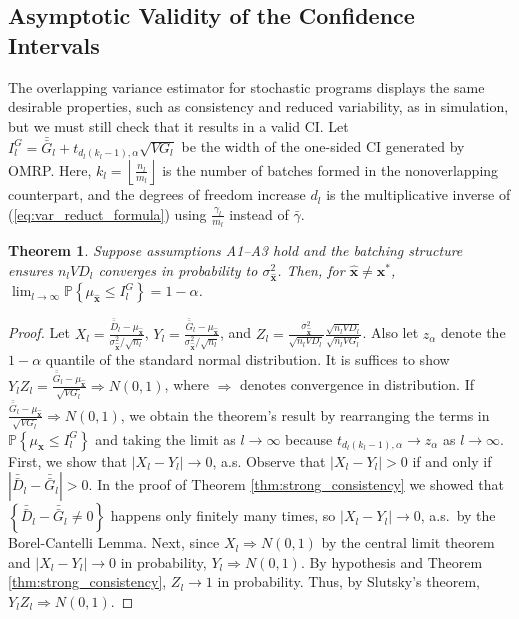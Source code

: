 \documentclass[12pt]{article}
\newtheorem{theorem}{Theorem}
\newcommand{\p}[1]{\mathbb{P} \left\{ #1 \right\}}
\newcommand{\x}{\mathbf{x}}
\newcommand{\xh}{{\hat{\x}}}
\newcommand{\xs}{\x^*}
\newcommand{\gammab}{\bar{\gamma}}
\newcommand{\gb}{\bar{G}}
\newcommand{\gbb}{\bar{\gb}}
\newcommand{\db}{\bar{D}}
\newcommand{\dbb}{\bar{\db}}
\begin{document}
\subsection{Asymptotic Validity of the Confidence Intervals}
\label{ssec:validity}

The overlapping variance estimator for stochastic programs displays the same desirable properties, such as consistency and reduced variability, as in simulation, but we must still check that it results in a valid CI.  
Let $I^G_l = \gbb_l + t_{d_l \left( k_l-1\right),\alpha} \sqrt{VG_l}$ be the width of the one-sided CI generated by OMRP. 
Here, $k_l= \left\lfloor\frac{n_l}{m_l}\right\rfloor $ is the number of batches formed in the nonoverlapping counterpart, and the degrees of freedom increase $d_l$ is the multiplicative inverse of (\ref{eq:var_reduct_formula}) using $\frac{\gamma_l}{m_l}$ instead of $\gammab$.

\begin{theorem} \label{thm:conf_int}
	Suppose assumptions A1--A3 hold and the batching structure ensures $n_l VD_l$ converges in probability to $\sigma^2_\xh$.  
        Then, for $\xh \neq \xs$, $\lim_{l\rightarrow\infty} \p{\mu_\xh \leq I^G_l} = 1 - \alpha$.
\end{theorem}

\begin{proof} 
			Let $X_l = \frac{\dbb_l - \mu_\xh}{\sigma^2_\xh/\sqrt{n_l}}$, $Y_l = \frac{\gbb_l - \mu_\xh}{\sigma^2_\xh/\sqrt{n_l}}$, and $Z_l = \frac{\sigma^2_\xh}{\sqrt{n_lVD_l}} \frac{\sqrt{n_lVD_l}}{\sqrt{n_lVG_l}}$. 
			Also let $z_{\alpha}$ denote the $1-\alpha$ quantile of the standard normal distribution. 
        It is suffices to show $Y_lZ_l = \frac{\gbb_l - \mu_\xh}{\sqrt{VG_l}} \Rightarrow N(0,1)$, where $\Rightarrow$ denotes convergence in distribution.
			If $\frac{\gbb_l - \mu_\xh}{\sqrt{VG_l}} \Rightarrow N(0,1)$, we obtain the theorem's result by rearranging the terms in $\p{\mu_\xh \leq I^G_l}$ and taking the limit as $l \rightarrow \infty$ because $t_{d_l(k_l -1),\alpha} \rightarrow z_{\alpha}$ as $l \rightarrow \infty$.
        First, we show that $|X_l - Y_l| \rightarrow 0$, a.s.  
		  Observe that $|X_l - Y_l| > 0$ if and only if $|\dbb_l - \gbb_l| > 0$.  
        In the proof of Theorem \ref{thm:strong_consistency} we showed that $\left\{ \dbb_l - \gbb_l \neq 0 \right\}$ happens only finitely many times, so $|X_l - Y_l| \rightarrow 0$, a.s.\ by the Borel-Cantelli Lemma. 
        Next, since $X_l \Rightarrow N(0,1)$  by the central limit theorem and $|X_l - Y_l| \rightarrow 0$ in probability, $Y_l \Rightarrow N(0,1)$.  
        By hypothesis and Theorem \ref{thm:strong_consistency}, $Z_l \rightarrow 1$ in probability.  
        Thus, by Slutsky's theorem, $Y_lZ_l \Rightarrow N(0,1)$.
\end{proof}
\end{document}
